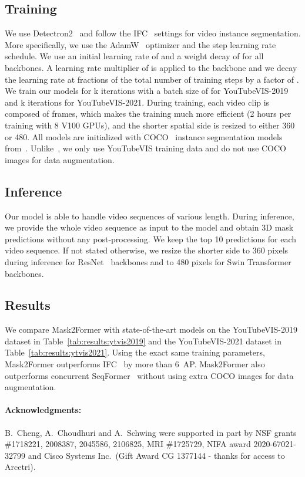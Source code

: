 \documentclass[10pt,twocolumn,letterpaper]{article}
\newcommand{\modelname}{Mask2Former\xspace}
\newcommand{\tabref}[1]{Table~\ref{#1}}
\begin{document}
\subsection{Training}
We use Detectron2~\cite{wu2019detectron2} and follow the IFC~\cite{ifc} settings for video instance segmentation. More specifically, we use the  AdamW~\cite{loshchilov2018decoupled} optimizer and the step learning rate schedule. We use an initial learning rate of  and a weight decay of  for all backbones. A learning rate multiplier of  is applied to the backbone and we decay the learning rate at  fractions of the total number of training steps by a factor of . We train our models for k iterations with a batch size of  for YouTubeVIS-2019 and k iterations for YouTubeVIS-2021. During training, each video clip is composed of  frames, which makes the training much more efficient (2 hours per training with 8 V100 GPUs),  and the shorter spatial side is resized to either 360 or 480. All models are initialized with COCO~\cite{lin2014coco} instance segmentation models from~\cite{cheng2021mask2former}. Unlike~\cite{wu2021seqformer}, we only use YouTubeVIS training data and do not use COCO images for data augmentation. 

\subsection{Inference}

Our model is able to handle video sequences of various length. During inference, we provide the whole video sequence as input to the model and obtain 3D mask predictions without any post-processing. We keep the top 10 predictions for each video sequence. If not stated otherwise, we resize the shorter side to 360 pixels during inference for ResNet~\cite{he2016deep} backbones and to 480 pixels for Swin Transformer~\cite{liu2021swin} backbones.

\subsection{Results}

We compare \modelname with state-of-the-art models on the YouTubeVIS-2019 dataset in \tabref{tab:results:ytvis2019} and the YouTubeVIS-2021 dataset in \tabref{tab:results:ytvis2021}. Using the exact same training parameters, \modelname outperforms IFC~\cite{ifc} by more than 6~AP. \modelname also outperforms concurrent SeqFormer~\cite{wu2021seqformer} without using extra COCO images for data augmentation. 


\paragraph{Acknowledgments:} B.~Cheng, A.~Choudhuri and A.~Schwing were supported in part by NSF grants \#1718221, 2008387, 2045586, 2106825, MRI \#1725729, NIFA award 2020-67021-32799 and Cisco Systems Inc.\ (Gift Award CG 1377144 - thanks for access to Arcetri).

{\small


}
\end{document}
